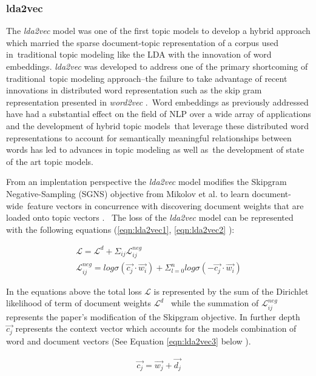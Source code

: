 \documentclass[letterpaper,12pt]{article}
\begin{document}
\subsubsection{lda2vec}
The \emph{lda2vec} model was one of the first topic models to develop a hybrid approach which married the sparse document-topic representation of a corpus used in\
traditional topic modeling like the LDA with the innovation of word embeddings. \emph{lda2vec} was developed to address one of the primary shortcoming of traditional\
topic modeling approach--the failure to take advantage of recent innovations in distributed word representation such as the skip gram representation presented in \emph{word2vec} \cite{mikolov2013distributed}.\
Word embeddings as previously addressed have had a substantial effect on the field of NLP over a wide array of applications and the development of hybrid topic models\
that leverage these distributed word representations to account for semantically meaningful relationships between words has led to advances in topic modeling as well as\
the development of state of the art topic models.

From an implentation perspective the \emph{lda2vec} model modifies the Skipgram Negative-Sampling (SGNS) objective from Mikolov et al. \cite{mikolov2013distributed} to learn document-wide\
feature vectors in concurrence with discovering document weights that are loaded onto topic vectors \cite{moody2016mixing}. \
The loss of the \emph{lda2vec} model can be represented with the following equations (\ref{eqn:lda2vec1}, \ref{eqn:lda2vec2} \cite{moody2016mixing}):

\begin{eqnarray}
	\label{eqn:lda2vec1}
		\mathcal{L} = \mathcal{L}^d +\Sigma_{ij} \mathcal{L}^{neg}_{ij}  \\
	\label{eqn:lda2vec2}
	\mathcal{L}^{neg}_{ij} = log \sigma (\vec{c_j} \cdot \vec{w_i}) + \Sigma^n_{l=0} log \sigma (-\vec{c_j} \cdot \vec{w_i})
\end{eqnarray}

In the equations above the total loss $\mathcal{L}$ is represented by the sum of the Dirichlet likelihood of term of document weights $\mathcal{L}^d$ \
while the summation of $\mathcal{L}^{neg}_{ij}$ represents the paper's modification of the Skipgram objective. In further depth \
$\vec{c_j}$ represents the context vector which accounts for the models combination of word and document vectors (See Equation \ref{eqn:lda2vec3} below \cite{moody2016mixing}).

\begin{eqnarray}
	\label{eqn:lda2vec3}
	\vec{c_j} = \vec{w_j} + \vec{d_j}
\end{eqnarray}
\end{document}
